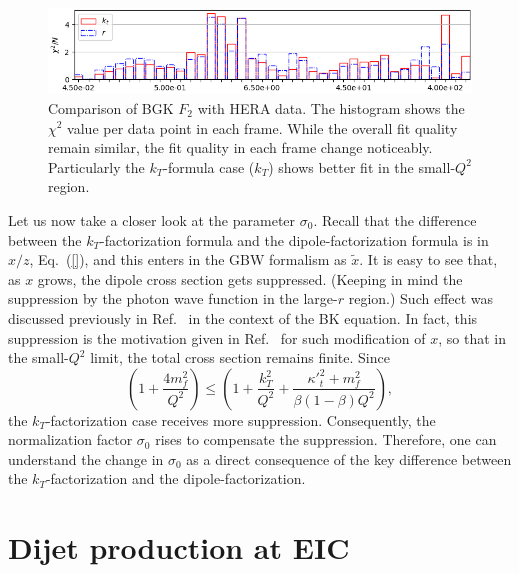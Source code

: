 \documentclass[11pt]{article}
\begin{document}
\begin{figure}[p]
\includegraphics[width=\textwidth]{./plots/Figure_2-3.png}
\caption{Comparison of BGK $F_2$ with HERA data. The histogram shows the $\chi^2$ value per data point in each frame. While the overall fit quality remain similar, the fit quality in each frame change noticeably. Particularly the $k_T$-formula case ($k_T$) shows better fit in the small-$Q^2$ region.}
\label{fig:BGK-Grid}
\end{figure}

Let us now take a closer look at the parameter $\sigma_0$. Recall that the
difference between the $k_T$-factorization formula and the dipole-factorization
formula is in $x/z$, Eq.~(\ref{}), and this enters in the GBW formalism as
$\tilde{x}$. It is easy to see that, as $x$ grows, the dipole cross section gets
suppressed. (Keeping in mind the suppression by the photon wave function in the
large-$r$ region.) Such effect was discussed previously in
Ref.~\cite{Kutak:2004ym} in the context of the BK equation. In fact, this
suppression is the motivation given in Ref.~\cite{Golec-Biernat:1998zce} for
such modification of $x$, so that in the small-$Q^2$ limit, the total cross
section remains finite. Since 
%
\begin{equation}
\left(1+\frac{4 m_f^2}{Q^2}\right)\leq\left(1+\frac{k_T^2}{Q^2}+\frac{{\kappa'}_t^2+m_f^2}{\beta(1-\beta)Q^2}\right),
\end{equation}
%
the $k_T$-factorization case receives more suppression. Consequently, the
normalization factor $\sigma_0$ rises to compensate the suppression.  Therefore,
one can understand the change in $\sigma_0$ as a direct consequence of the key
difference between the $k_T$-factorization and the dipole-factorization.

\section{Dijet production at EIC}
\label{sec:dijetsEIC}
\end{document}
